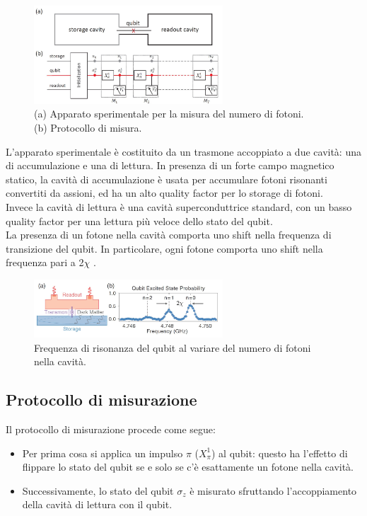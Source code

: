\documentclass[10pt,a4paper]{article}
\begin{document}
\begin{figure}[h]
    \centering
    \includegraphics[width=0.63\textwidth]{cavity.JPG}
    \caption{(a) Apparato sperimentale per la misura del numero di fotoni.\\ (b) Protocollo di misura.}
    \label{app}
\end{figure}
\FloatBarrier

L’apparato sperimentale è costituito da un trasmone accoppiato a due cavità: una di accumulazione e una di lettura. In presenza di un forte campo magnetico statico, la cavità di accumulazione è usata per accumulare fotoni risonanti convertiti da assioni, ed ha un alto quality factor per lo storage di fotoni.\\
Invece la cavità di lettura è una cavità superconduttrice standard, con un basso quality factor per una lettura più veloce dello stato del qubit.\\

La presenza di un fotone nella cavità comporta uno shift nella frequenza di transizione del qubit. In particolare, ogni fotone comporta uno shift nella frequenza pari a 2$\chi$ .

\begin{figure}[h]
    \centering
    \includegraphics[width=0.63\textwidth]{qubit_freq.JPG}
    \caption{Frequenza di risonanza del qubit al variare del numero di fotoni nella cavità.}
    \label{shift}
\end{figure}
\FloatBarrier

\subsection{Protocollo di misurazione}
Il protocollo di misurazione procede come segue:\\
\begin{itemize}
    \item Per prima cosa si applica un impulso $\pi$ ($X^1_\pi$) al qubit: questo ha l’effetto di flippare lo stato del qubit se e solo se c’è esattamente un fotone nella cavità.
    \item Successivamente, lo stato del qubit $\sigma_z$ è misurato sfruttando l’accoppiamento della cavità di lettura con il qubit.
\end{itemize}
\end{document}
